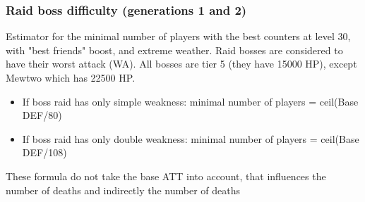 \documentclass[12pt]{beamer}
\begin{document}
\begin{frame}
\begin{block}{}
\begin{footnotesize}
\begin{center}
\end{center}

\end{footnotesize}
\end{block}
\end{frame}

\begin{frame}
\begin{footnotesize}
\frametitle{Raid boss difficulty (generations 1 and 2)}

\begin{block}{}
Estimator for the minimal number of players with the best counters at level 30, with "best friends" boost, and extreme weather. Raid bosses are considered to have their worst attack (WA). All bosses are tier 5 (they have 15000 HP), except Mewtwo which has 22500 HP.
\begin{itemize}
  \item If boss raid has only simple weakness: minimal number of players = ceil(Base DEF/80)
  \item If boss raid has only double weakness: minimal number of players = ceil(Base DEF/108)
\end{itemize}
These formula do not take the base ATT into account, that influences the number of deaths and indirectly the number of deaths 

\medskip


\end{block}
\end{footnotesize}
\end{frame}
\end{document}

